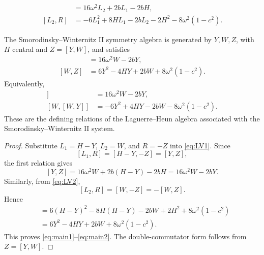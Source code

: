 \documentclass[10pt,a4paper]{amsart}
\begin{document}
\begin{align}
 [L_1,R]&=16\omega^2L_2+2bL_1-2bH,                         \label{eq:LV1}\\
 [L_2,R]&=-6L_1^2+8HL_1-2bL_2-2H^2-8\omega^2(1-c^2).
                                                                    \label{eq:LV2}
\end{align}

\begin{theorem}
The Smorodinsky--Winternitz II symmetry algebra is generated by \(Y,W,Z\),
with \(H\) central and \(Z=[Y,W]\), and satisfies
\begin{align}
 [Y,Z]&=16\omega^2W-2bY,                                      \label{eq:main1}\\
 [W,Z]&=6Y^2-4HY+2bW+8\omega^2(1-c^2).                         \label{eq:main2}
\end{align}
Equivalently,
\begin{align}
 [Y,[Y,W]]&=16\omega^2W-2bY,                                  \label{eq:double1}\\
 [W,[W,Y]]&=-6Y^2+4HY-2bW-8\omega^2(1-c^2).                    \label{eq:double2}
\end{align}
These are the defining relations of the Laguerre--Heun algebra associated
with the Smorodinsky--Winternitz II system.
\end{theorem}

\begin{proof}
Substitute \(L_1=H-Y\), \(L_2=W\), and \(R=-Z\) into
\eqref{eq:LV1}.  Since
\[
        [L_1,R]=[H-Y,-Z]=[Y,Z],
\]
the first relation gives
\[
 [Y,Z]
 =
 16\omega^2W+2b(H-Y)-2bH
 =
 16\omega^2W-2bY.
\]
Similarly, from \eqref{eq:LV2},
\[
        [L_2,R]=[W,-Z]=-[W,Z].
\]
Hence
\begin{align*}
[W,Z]
&=
6(H-Y)^2-8H(H-Y)-2bW+2H^2+8\omega^2(1-c^2)  \\
&=
6Y^2-4HY+2bW+8\omega^2(1-c^2).
\end{align*}
This proves \eqref{eq:main1}--\eqref{eq:main2}.  The double-commutator form
follows from \(Z=[Y,W]\).
\end{proof}
\end{document}
